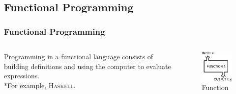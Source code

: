\documentclass[hideothersubsections]{beamer}
\newcommand{\progLang}[1]{\textsc{#1}}
\begin{document}
\subsection{Functional Programming}
\begin{frame}
\frametitle{Functional Programming}
  \begin{columns}[T]
    \begin{column}{.6\textwidth}
     \begin{block}{}
Programming in a functional language consists of building definitions and using the computer to evaluate expressions. 
\\*For example, \progLang{Haskell}.
\note[item]{}
    \end{block}
    \end{column}
    \begin{column}{.4\textwidth}
    \begin{block}{}
\begin{figure}
    \includegraphics[width=\textwidth]{function-machine.jpeg} 
    \caption{Function}
 \end{figure}   
    \end{block}
    \end{column}
  \end{columns}
\end{frame}
\end{document}
